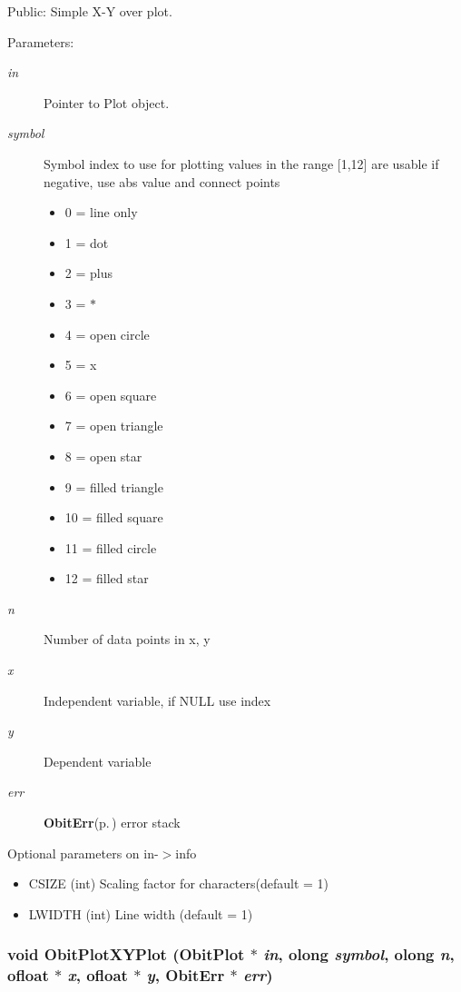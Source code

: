 Public: Simple X-Y over plot. 

\begin{Desc}
\item[Parameters:]
\begin{description}
\item[{\em in}]Pointer to Plot object. \item[{\em symbol}]Symbol index to use for plotting values in the range [1,12] are usable if negative, use abs value and connect points \begin{itemize}
\item 0 = line only \item 1 = dot \item 2 = plus \item 3 = $\ast$ \item 4 = open circle \item 5 = x \item 6 = open square \item 7 = open triangle \item 8 = open star \item 9 = filled triangle \item 10 = filled square \item 11 = filled circle \item 12 = filled star\end{itemize}
\item[{\em n}]Number of data points in x, y \item[{\em x}]Independent variable, if NULL use index \item[{\em y}]Dependent variable \item[{\em err}]{\bf Obit\-Err}{\rm (p.\,\pageref{structObitErr})} error stack\end{description}
\end{Desc}
Optional parameters on in-$>$info \begin{itemize}
\item CSIZE (int) Scaling factor for characters(default = 1) \item LWIDTH (int) Line width (default = 1) \end{itemize}
\subsubsection{\setlength{\rightskip}{0pt plus 5cm}void Obit\-Plot\-XYPlot ({\bf Obit\-Plot} $\ast$ {\em in}, {\bf olong} {\em symbol}, {\bf olong} {\em n}, {\bf ofloat} $\ast$ {\em x}, {\bf ofloat} $\ast$ {\em y}, {\bf Obit\-Err} $\ast$ {\em err})}\label{ObitPlot_8c_a10}


